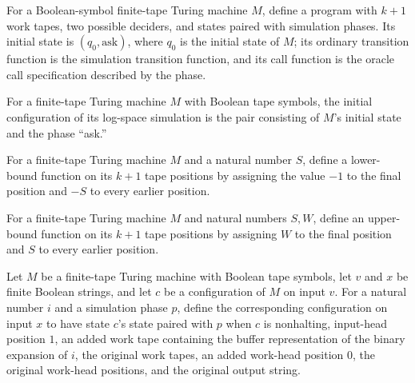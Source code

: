 \begin{definition}
\label{Complexity.LogProg.OIS.prog}
\leanok
{}
For a Boolean-symbol finite-tape Turing machine $M$, define a program with $k+1$ work
tapes, two possible deciders, and states paired with simulation phases. Its initial
state is $(q_0,\mathrm{ask})$, where $q_0$ is the initial state of $M$; its ordinary
transition function is the simulation transition function, and its call function is the
oracle call specification described by the phase.
\end{definition}

\begin{definition}
\label{Complexity.LogProg.OIS.start}
\leanok
{}
For a finite-tape Turing machine $M$ with Boolean tape symbols, the initial
configuration of its log-space simulation is the pair consisting of $M$’s initial state
and the phase “ask.”
\end{definition}

\begin{definition}
\label{Complexity.LogProg.OIS.lo}
\leanok
For a finite-tape Turing machine $M$ and a natural number $S$, define a lower-bound
function on its $k+1$ tape positions by assigning the value $-1$ to the final position
and $-S$ to every earlier position.
\end{definition}

\begin{definition}
\label{Complexity.LogProg.OIS.hi}
\leanok
For a finite-tape Turing machine $M$ and natural numbers $S,W$, define an upper-bound
function on its $k+1$ tape positions by assigning $W$ to the final position and $S$ to
every earlier position.
\end{definition}

\begin{definition}
\label{Complexity.LogProg.OIS.imageCfg}
\leanok
{}
Let $M$ be a finite-tape Turing machine with Boolean tape symbols, let $v$ and $x$ be
finite Boolean strings, and let $c$ be a configuration of $M$ on input $v$. For a
natural number $i$ and a simulation phase $p$, define the corresponding configuration on
input $x$ to have state $c$’s state paired with $p$ when $c$ is nonhalting, input-head
position $1$, an added work tape containing the buffer representation of the binary
expansion of $i$, the original work tapes, an added work-head position $0$, the original
work-head positions, and the original output string.
\end{definition}

